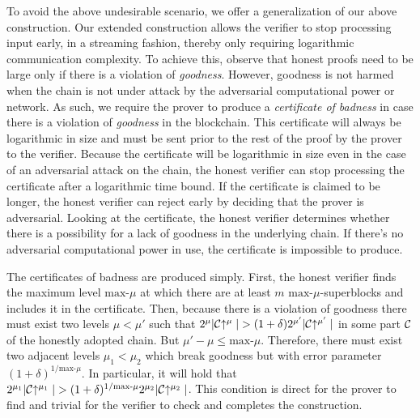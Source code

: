 To avoid the above undesirable scenario, we offer a generalization of our above
construction. Our extended construction allows the verifier to stop processing
input early, in a streaming fashion, thereby only requiring logarithmic
communication complexity. To achieve this, observe that honest proofs need to
be large only if there is a violation of \textit{goodness}. However, goodness is
not harmed when the chain is not under attack by the adversarial computational
power or network. As such, we require the prover to produce a
\textit{certificate of badness} in case there is a violation of
\textit{goodness} in the blockchain. This certificate will always be logarithmic
in size and must be sent prior to the rest of the proof by the prover to the
verifier. Because the certificate will be logarithmic in size even in the case
of an adversarial attack on the chain, the honest verifier can stop processing
the certificate after a logarithmic time bound. If the certificate is claimed to
be longer, the honest verifier can reject early by deciding that the prover is
adversarial. Looking at the certificate, the honest verifier determines whether
there is a possibility for a lack of goodness in the underlying chain. If
there's no adversarial computational power in use, the certificate is impossible
to produce.

The certificates of badness are produced simply. First, the honest verifier
finds the maximum level $\text{max-}\mu$ at which there are at least $m$
$\text{max-}\mu$-superblocks and includes it in the certificate. Then, because
there is a violation of goodness there must exist two levels $\mu < \mu'$ such
that $2^\mu|\mathcal{C}\negthickspace\uparrow^\mu| > (1 + \delta)2^{\mu'}|\mathcal{C}\negthickspace\uparrow^{\mu'}|$
in some part $\mathcal{C}$ of the honestly adopted chain. But $\mu' - \mu \leq
\text{max-}\mu$. Therefore, there must exist two adjacent levels $\mu_1 < \mu_2$
which break goodness but with error parameter $(1 +
\delta)^{1/{\text{max-}\mu}}$. In particular, it will hold that
$2^{\mu_1}|\mathcal{C}\negthickspace\uparrow^{\mu_1}| > (1 +
\delta)^{1/{\text{max-}\mu}}2^{\mu_2}|\mathcal{C}\negthickspace\uparrow^{\mu_2}|$. This condition
is direct for the prover to find and trivial for the verifier to check and
completes the construction.
